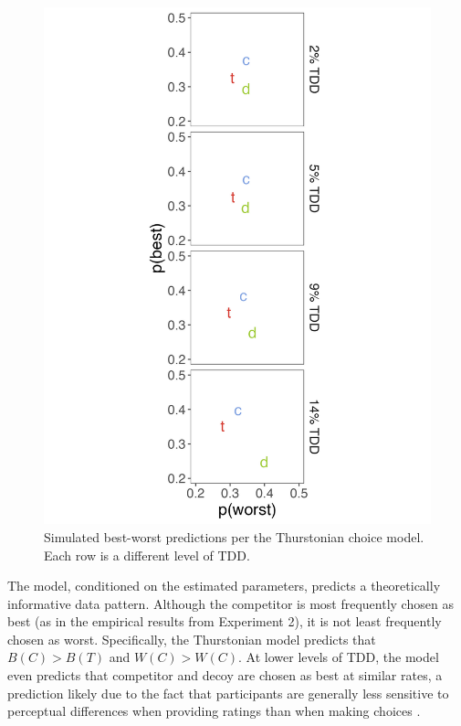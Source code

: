 \begin{figure}
   \centering
   \includegraphics[width=\linewidth]{figures/bw_preds_sigma_constant_comp_effect_no_outliers.jpeg}
   \caption{Simulated best-worst predictions per the Thurstonian choice model. Each row is a different level of TDD.}
   \label{fig:bw_sim}
\end{figure}

The model, conditioned on the estimated parameters, predicts a theoretically informative data pattern. Although the competitor is most frequently chosen as best (as in the empirical results from Experiment 2), it is not least frequently chosen as worst. Specifically, the Thurstonian model predicts that $B(C)>B(T)$ and $W(C)>W(C)$. At lower levels of TDD, the model even predicts that competitor and decoy are chosen as best at similar rates, a prediction likely due to the fact that participants are generally less sensitive to perceptual differences when providing ratings than when making choices \parencite{gronau2023choice}.

